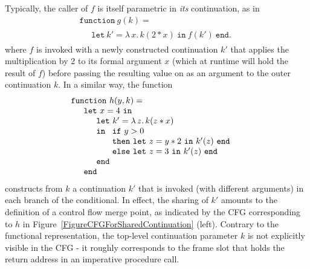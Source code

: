 Typically, the caller of $f$ is itself parametric in \emph{its}
continuation, as in
\begin{equation}
\label{ContinuationCode3}
\begin{array}{l}
\mathtt{function}\ g (k) =\\
\quad
\begin{array}{l}
\mathtt{let}\ k' = \lambda\, x .\, k (2*x)\ \mathtt{in}\ f(k')\ \mathtt{end}.
\end{array}
\end{array}
\end{equation}
where $f$ is invoked with a newly constructed continuation $k'$ that
applies the multiplication by $2$ to its formal
argument $x$ (which at runtime will hold the result of $f$) before
passing the resulting value on as an argument to the outer
continuation $k$.
In a similar way, the function
\begin{equation}
\label{ContinuationCode4}
\begin{array}{l}
\mathtt{function}\ h (y, k) =\\
\quad
  \begin{array}{l}
    \mathtt{let}\ x=4\ \mathtt{in} \\
    \quad \begin{array}{l}
            \mathtt{let}\ k' = \lambda\, z .\, k (z*x)\\
            \mathtt{in}\
               \begin{array}[t]{l}
                 \mathtt{if}\ y>0\\
                 \mathtt{then\ let}\ z = y*2\ \mathtt{in}\ k'(z)\ \mathtt{end}\\
                 \mathtt{else\ let}\ z = 3\ \mathtt{in}\ k'(z)\ \mathtt{end}
               \end{array}\\
            \mathtt{end}
          \end{array} \\
    \mathtt{end}
  \end{array}
\end{array}
\end{equation}
constructs from $k$ a continuation $k'$ that is invoked (with
different arguments) in each branch of the conditional. In effect,
the sharing of $k'$ amounts to the definition of a control flow merge
point, as indicated by the CFG corresponding to $h$ in
Figure~\ref{FigureCFGForSharedContinuation} (left).  Contrary to the
functional representation, the top-level continuation parameter $k$ is
not explicitly visible in the CFG - it roughly corresponds to the
frame slot that holds the return address in an imperative procedure
call.


